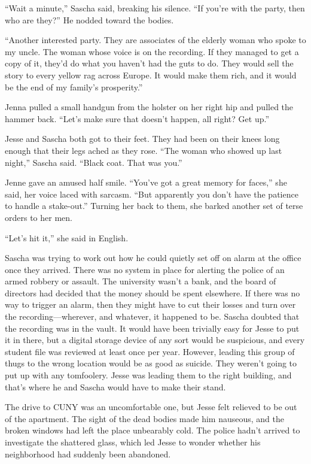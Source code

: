 \documentclass[12pt]{book}
\begin{document}
``Wait a minute,'' Sascha said, breaking his silence.  ``If you're with the party, then who are they?''  He nodded toward the bodies.

``Another interested party.  They are associates of the elderly woman who spoke to my uncle.  The woman whose voice is on the recording.  If they managed to get a copy of it, they'd do what you haven't had the guts to do.  They would sell the story to every yellow rag across Europe.  It would make them rich, and it would be the end of my family's prosperity.''

Jenna pulled a small handgun from the holster on her right hip and pulled the hammer back.  ``Let's make sure that doesn't happen, all right?  Get up.''

Jesse and Sascha both got to their feet.  They had been on their knees long enough that their legs ached as they rose.  ``The woman who showed up last night,'' Sascha said.  ``Black coat.  That was you.''

Jenne gave an amused half smile.  ``You've got a great memory for faces,'' she said, her voice laced with sarcasm.  ``But apparently you don't have the patience to handle a stake-out.''  Turning her back to them, she barked another set of terse orders to her men.

``Let's hit it,'' she said in English.

Sascha was trying to work out how he could quietly set off on alarm at the office once they arrived.  There was no system in place for alerting the police of an armed robbery or assault.  The university wasn't a bank, and the board of directors had decided that the money should be spent elsewhere.  If there was no way to trigger an alarm, then they might have to cut their losses and turn over the recording---wherever, and whatever, it happened to be.  Sascha doubted that the recording was in the vault.  It would have been trivially easy for Jesse to put it in there, but a digital storage device of any sort would be suspicious, and every student file was reviewed at least once per year.  However, leading this group of thugs to the wrong location would be as good as suicide.  They weren't going to put up with any tomfoolery.  Jesse was leading them to the right building, and that's where he and Sascha would have to make their stand.

The drive to CUNY was an uncomfortable one, but Jesse felt relieved to be out of the apartment.  The sight of the dead bodies made him nauseous, and the broken windows had left the place unbearably cold.  The police hadn't arrived to investigate the shattered glass, which led Jesse to wonder whether his neighborhood had suddenly been abandoned.
\end{document}
